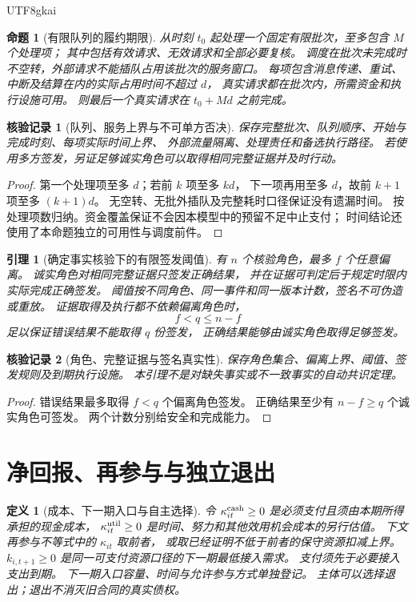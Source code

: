 \documentclass[12pt,a4paper,openany]{report}
\newtheorem{definition}{定义}[chapter]
\newtheorem{lemma}{引理}[chapter]
\newtheorem{proposition}{命题}[chapter]
\newtheorem{Certificate}{核验记录}[chapter]
\begin{document}
\begin{CJK*}{UTF8}{gkai}
\begin{proposition}[有限队列的履约期限]
\label{prop:liveness}
从时刻 \(t_0\) 起处理一个固定有限批次，至多包含 \(M\) 个处理项；
其中包括有效请求、无效请求和全部必要复核。
调度在批次未完成时不空转，外部请求不能插队占用该批次的服务窗口。
每项包含消息传递、重试、中断及结算在内的实际占用时间不超过 \(d\)，
真实请求都在批次内，所需资金和执行设施可用。
则最后一个真实请求在 \(t_0+Md\) 之前完成。
\end{proposition}
\begin{Certificate}[队列、服务上界与不可单方否决]
保存完整批次、队列顺序、开始与完成时刻、每项实际时间上界、
外部流量隔离、处理责任和备选执行路径。
若使用多方签发，另证足够诚实角色可以取得相同完整证据并及时行动。
\end{Certificate}
\begin{proof}
第一个处理项至多 \(d\)；若前 \(k\) 项至多 \(kd\)，
下一项再用至多 \(d\)，故前 \(k+1\) 项至多 \((k+1)d\)。
无空转、无批外插队及完整耗时口径保证没有遗漏时间。
按处理项数归纳。资金覆盖保证不会因本模型中的预留不足中止支付；
时间结论还使用了本命题独立的可用性与调度前件。
\end{proof}

\begin{lemma}[确定事实核验下的有限签发阈值]
\label{lem:quorum}
有 \(n\) 个核验角色，最多 \(f\) 个任意偏离。
诚实角色对相同完整证据只签发正确结果，
并在证据可判定后于规定时限内实际完成正确签发。
阈值按不同角色、同一事件和同一版本计数，签名不可伪造或重放。
证据取得及执行都不依赖偏离角色时，
\[
f<q\le n-f
\]
足以保证错误结果不能取得 \(q\) 份签发，
正确结果能够由诚实角色取得足够签发。
\end{lemma}
\begin{Certificate}[角色、完整证据与签名真实性]
保存角色集合、偏离上界、阈值、签发规则及到期执行设施。
本引理不是对缺失事实或不一致事实的自动共识定理。
\end{Certificate}
\begin{proof}
错误结果最多取得 \(f<q\) 个偏离角色签发。
正确结果至少有 \(n-f\ge q\) 个诚实角色可签发。
两个计数分别给安全和完成能力。
\end{proof}

\section{净回报、再参与与独立退出}
\begin{definition}[成本、下一期入口与自主选择]
令 \(\kappa_{it}^{\rm cash}\ge0\) 是必须支付且须由本期所得承担的现金成本，
\(\kappa_{it}^{\rm util}\ge0\) 是时间、努力和其他效用机会成本的另行估值。
下文再参与不等式中的 \(\kappa_{it}\) 取前者，
或取已经证明不低于前者的保守资源扣减上界。
\(k_{i,t+1}\ge0\) 是同一可支付资源口径的下一期最低接入需求。
支付须先于必要接入支出到期。
下一期入口容量、时间与允许参与方式单独登记。
主体可以选择退出；退出不消灭旧合同的真实债权。
\end{definition}


\end{CJK*}
\end{document}
